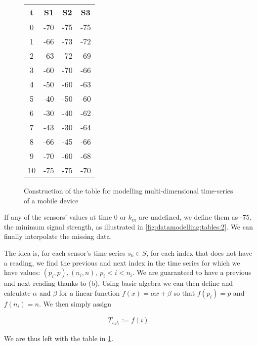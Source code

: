 \begin{figure}[H]
\begin{minipage}[t]{0.3\textwidth}
\begin{tabular}{ |c||c|c|c| }
             \hline
        \end{tabular}
        \label{fig:datamodelling:tables:2}
    \end{minipage}
    \hfill
    \begin{minipage}[t]{0.3\textwidth}
        \centering
        \begin{tabular}{ |c||c|c|c| } 
             \hline
             t & S1 & S2 & S3 \\
             \hline
             0  & -70 & -75 & -75 \\ 
             1  & -66 & -73 & -72 \\ 
             2  & -63 & -72 & -69 \\ 
             3  & -60 & -70 & -66 \\ 
             4  & -50 & -60 & -63 \\ 
             5  & -40 & -50 & -60 \\ 
             6  & -30 & -40 & -62 \\ 
             7  & -43 & -30 & -64 \\ 
             8  & -66 & -45 & -66 \\ 
             9  & -70 & -60 & -68 \\ 
             10 & -75 & -75 & -70 \\
             \hline
        \end{tabular}
        \label{fig:datamodelling:tables:3}
    \end{minipage}
    \caption{Construction of the table for modelling multi-dimensional time-series of a mobile device}
\end{figure}



If any of the sensors' values at time 0 or $k_m$ are undefined, we define them as -75, the minimum signal strength, as illustrated in \cref{fig:datamodelling:tables:2}. We can finally interpolate the missing data.\\

\par
The idea is, for each sensor's time series $s_k \in S$, for each index that does not have a reading, we find the previous and next index in the time series for which we have values: $(p_i, p), (n_i, n),\ p_i<i<n_i$. We are guaranteed to have a previous and next reading thanks to (b). Using basic algebra we can then define and calculate $\alpha$ and $\beta$ for a linear function $f(x)=\alpha x+\beta$ so that $f(p_i)=p$ and $f(n_i)=n$. We then simply assign

\begin{align*}
     T_{s_k t_i} := f(i)
\end{align*}

We are thus left with the table in \cref{fig:datamodelling:tables:3}.
